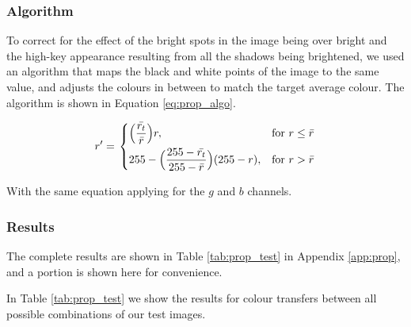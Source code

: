 \subsubsection*{Algorithm}
To correct for the effect of the bright spots in the image being over bright and the high-key appearance resulting from all the shadows being brightened, we used an algorithm that maps the black and white points of the image to the same value, and adjusts the colours in between to match the target average colour. The algorithm is shown in Equation \ref{eq:prop_algo}.

\begin{equation} \label{eq:prop_algo}
  r' = \left.
  \begin{dcases}
    \displaystyle \Big(\frac{\bar{r_t}}{\bar{r}}\Big)r, & \text{for } r \leq \bar{r} \\
    \displaystyle 255 - 
    \Big(\frac{255 - \bar{r_t}}{255 - \bar{r}}\Big)(255 - r), & \text{for } r > \bar{r} \\
  \end{dcases}
  \right.
\end{equation}



With the same equation applying for the $g$ and $b$ channels.

\subsubsection*{Results}
The complete results are shown in Table \ref{tab:prop_test} in Appendix \ref{app:prop}, and a portion is shown here for convenience.

In Table \ref{tab:prop_test} we show the results for colour transfers between all possible combinations of our test images.


